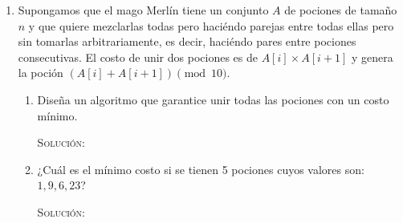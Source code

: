 \documentclass[letterpaper,11pt]{article}
\begin{document}
\begin{enumerate}
    \item Supongamos que el mago Merlín tiene un conjunto $A$ de pociones de 
    tamaño $n$ y que quiere mezclarlas todas pero haciéndo parejas entre 
    todas ellas pero sin tomarlas arbitrariamente, es decir, haciéndo pares 
    entre pociones consecutivas. El costo de unir dos pociones es de 
    $A[i] \times A[i+1]$ y genera la poción $(A[i] + A[i+1]) \pmod{10}$. 
    \begin{enumerate}
        \item Diseña un algoritmo que garantice unir todas las pociones con 
        un costo mínimo.

        \textsc{Solución:}
        
        \item ¿Cuál es el mínimo costo si se tienen 5 pociones cuyos valores son:
        $1, 9, 6, 2 3$?

        \textsc{Solución:}
    \end{enumerate}

\end{enumerate}
\end{document}
